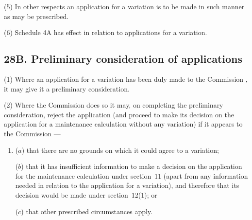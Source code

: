 \documentclass[12pt,a4paper]{article}
\begin{document}
(5) In other respects an application for a variation is to be made in such manner as may be prescribed.

(6) Schedule 4A has effect in relation to applications for a variation.


\subsection{28B. Preliminary consideration of applications}

(1) Where an application for a variation has been duly made to the 
Commission%
, 
it  %
may give it a preliminary consideration.

(2) Where 
the Commission  %
does so 
it  %
may, on completing the preliminary consideration, reject the application (and proceed to make 
its  %
decision on the application for a maintenance calculation without any variation) if it appears to 
the Commission%
—
\begin{enumerate}\item[]
($a$) that there are no grounds on which 
it  %
could agree to a variation;

($b$) that 
it  %
has insufficient information to make a decision on the application for the maintenance calculation under section~11 (apart from any information needed in relation to the application for a variation), and therefore that 
its  %
decision would be made under section~12(1); or

($c$) that other prescribed circumstances apply.
\end{enumerate}
\end{document}
